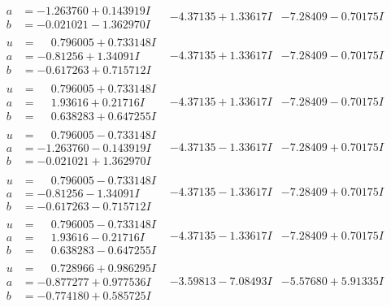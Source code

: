\documentclass[1p]{elsarticle_modified}
\theoremstyle{definition}
\begin{document}
$$\begin{array}{c|c|c}
\begin{aligned}
a &= -1.263760 + 0.143919 I \\
b &= -0.021021 - 1.362970 I\end{aligned}
 & -4.37135 + 1.33617 I & -7.28409 - 0.70175 I \\ \hline\begin{aligned}
u &= \phantom{-}0.796005 + 0.733148 I \\
a &= -0.81256 + 1.34091 I \\
b &= -0.617263 + 0.715712 I\end{aligned}
 & -4.37135 + 1.33617 I & -7.28409 - 0.70175 I \\ \hline\begin{aligned}
u &= \phantom{-}0.796005 + 0.733148 I \\
a &= \phantom{-}1.93616 + 0.21716 I \\
b &= \phantom{-}0.638283 + 0.647255 I\end{aligned}
 & -4.37135 + 1.33617 I & -7.28409 - 0.70175 I \\ \hline\begin{aligned}
u &= \phantom{-}0.796005 - 0.733148 I \\
a &= -1.263760 - 0.143919 I \\
b &= -0.021021 + 1.362970 I\end{aligned}
 & -4.37135 - 1.33617 I & -7.28409 + 0.70175 I \\ \hline\begin{aligned}
u &= \phantom{-}0.796005 - 0.733148 I \\
a &= -0.81256 - 1.34091 I \\
b &= -0.617263 - 0.715712 I\end{aligned}
 & -4.37135 - 1.33617 I & -7.28409 + 0.70175 I \\ \hline\begin{aligned}
u &= \phantom{-}0.796005 - 0.733148 I \\
a &= \phantom{-}1.93616 - 0.21716 I \\
b &= \phantom{-}0.638283 - 0.647255 I\end{aligned}
 & -4.37135 - 1.33617 I & -7.28409 + 0.70175 I \\ \hline\begin{aligned}
u &= \phantom{-}0.728966 + 0.986295 I \\
a &= -0.877277 + 0.977536 I \\
b &= -0.774180 + 0.585725 I\end{aligned}
 & -3.59813 - 7.08493 I & -5.57680 + 5.91335 I \\ \hline\begin{aligned}

\end{aligned}
\end{array}$$
\end{document}
